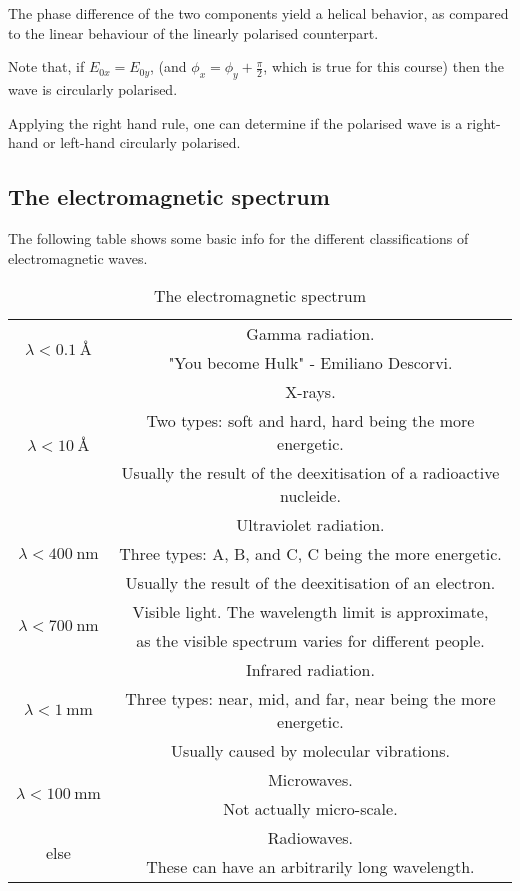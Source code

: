         The phase difference of the two components yield a helical behavior, 
        as compared to the linear behaviour of the linearly polarised counterpart.

        Note that, if $E_{0x} = E_{0y}$, (and $\phi_x = \phi_y + \frac{\pi}{2}$, which is true for this course)
            then the wave is circularly polarised.

        Applying the right hand rule, 
        one can determine if the polarised wave is a right-hand or left-hand circularly polarised.

\subsection{The electromagnetic spectrum}
    The following table shows some basic info for the different classifications of electromagnetic waves.
    \begin{longtable}[c]{@{}c|c@{}} 
        \caption{The electromagnetic spectrum}    
        \endfirsthead
        \hline
        \multirow{2}{*}{$\displaystyle\lambda < \SI{0.1}{\angstrom}$}
         & Gamma radiation. \\
         &"You become Hulk" - Emiliano Descorvi.\\
        \hline    
        \multirow{3}{*}{$\displaystyle\lambda < \SI{10}{\angstrom}$}
         & X-rays. \\
         & Two types: soft and hard, hard being the more energetic. \\
         & Usually the result of the deexitisation of a radioactive nucleide. \\
        \hline
        \multirow{3}{*}{$\displaystyle\lambda < \SI{400}{\nano\metre}$}
         & Ultraviolet radiation. \\
         & Three types: A, B, and C, C being the more energetic. \\
         & Usually the result of the deexitisation of an electron.\\
        \hline
        \multirow{2}{*}{$\displaystyle\lambda < \SI{700}{\nano\metre}$}
         & Visible light. The wavelength limit is approximate, \\
         & as the visible spectrum varies for different people.\\
        \hline
        \multirow{3}{*}{$\displaystyle\lambda < \SI{1}{\milli\metre}$}
         & Infrared radiation. \\
         & Three types: near, mid, and far, near being the more energetic. \\
         & Usually caused by molecular vibrations.\\
        \hline
        \multirow{2}{*}{$\displaystyle\lambda < \SI{100}{\milli\metre}$}
         & Microwaves.\\
         & Not actually micro-scale.\\
        \hline
        \multirow{2}{*}{else}
         & Radiowaves. \\
         & These can have an arbitrarily long wavelength.\\
        \hline
    \end{longtable}

